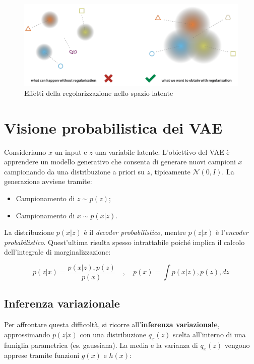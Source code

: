 \begin{figure}[!ht]
\centering
\includegraphics[width=\textwidth]{figure/RegEnc.png}
\caption{Effetti della regolarizzazione nello spazio latente}
\label{fig:regEnc}
\end{figure}

\section{Visione probabilistica dei VAE}

Consideriamo $x$ un input e $z$ una variabile latente. L’obiettivo del VAE è apprendere un modello generativo che consenta di generare nuovi campioni $x$ campionando da una distribuzione a priori su $z$, tipicamente $\mathcal{N}(0, I)$. La generazione avviene tramite:

\begin{itemize}
\item Campionamento di $z \sim p(z)$;
\item Campionamento di $x \sim p(x|z)$.
\end{itemize}

La distribuzione $p(x|z)$ è il \textit{decoder probabilistico}, mentre $p(z|x)$ è l'\textit{encoder probabilistico}. Quest’ultima risulta spesso intrattabile poiché implica il calcolo dell’integrale di marginalizzazione:

\begin{equation}
p(z|x) = \frac{p(x|z),p(z)}{p(x)} \quad,\quad p(x) = \int p(x|z),p(z),dz
\end{equation}

\subsection{Inferenza variazionale}

Per affrontare questa difficoltà, si ricorre all’\textbf{inferenza variazionale}, approssimando $p(z|x)$ con una distribuzione $q_x(z)$ scelta all’interno di una famiglia parametrica (es. gaussiana). La media e la varianza di $q_x(z)$ vengono apprese tramite funzioni $g(x)$ e $h(x)$:

